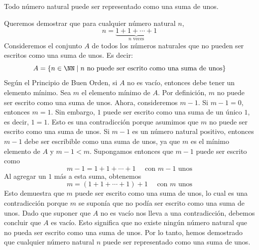 \begin{examplebox}{}{}
    Todo número natural puede ser representado como una suma de unos.

    \tcblower
    \demostracion Queremos demostrar que para cualquier número natural $n$,
    $$n = \underbrace{1 + 1 + \cdots + 1}_{n \text{ veces}}$$
    Consideremos el conjunto $A$ de todos los números naturales que no pueden ser escritos como una suma de unos. Es decir:
    $$A = \{ n \in \NN \mid n \text{ no puede ser escrito como una suma de unos} \}$$
    Según el Principio de Buen Orden, si $A$ no es vacío, entonces debe tener un elemento mínimo. Sea $m$ el elemento mínimo de $A$. Por definición, $m$ no puede ser escrito como una suma de unos. Ahora, consideremos $m - 1$. Si $m - 1 = 0$, entonces $m = 1$. Sin embargo, $1$ puede ser escrito como una suma de un único $1$, es decir, $1 = 1$. Esto es una contradicción porque asumimos que $m$ no puede ser escrito como una suma de unos. Si $m - 1$ es un número natural positivo, entonces $m - 1$ debe ser escribible como una suma de unos, ya que $m$ es el mínimo elemento de $A$ y $m - 1 < m$. Supongamos entonces que $m - 1$ puede ser escrito como
    $$m - 1 = 1 + 1 + \cdots + 1 \quad \text{ con } m - 1 \text{ unos}$$
    Al agregar un $1$ más a esta suma, obtenemos
    $$m = (1 + 1 + \cdots + 1) + 1 \quad \text{ con } m \text{ unos}$$
    Esto demuestra que $m$ puede ser escrito como una suma de unos, lo cual es una contradicción porque $m$ se suponía que no podía ser escrito como una suma de unos. Dado que suponer que $A$ no es vacío nos lleva a una contradicción, debemos concluir que $A$ es vacío. Esto significa que no existe ningún número natural que no pueda ser escrito como una suma de unos. Por lo tanto, hemos demostrado que cualquier número natural $n$ puede ser representado como una suma de unos.
\end{examplebox}

\newpage

